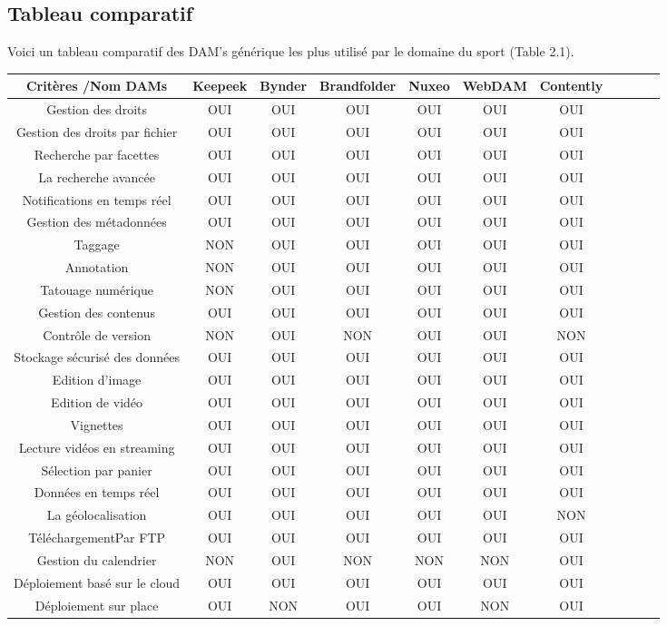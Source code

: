\subsection{Tableau comparatif}
Voici un tableau comparatif des DAM's générique les plus utilisé par le domaine du sport (Table 2.1).
\begin{sidewaystable}[ht]
\begin{center}
\begin{tabular}{|c|c|c|c|c|c|c|c|c|c|c|}
\hline   
Critères /Nom DAMs & Keepeek & Bynder & Brandfolder & Nuxeo &  WebDAM &  Contently \\

\hline
Gestion des droits & OUI & OUI & OUI & OUI & OUI & OUI  \\
\hline	
Gestion des droits par fichier  & OUI & OUI &OUI & OUI & OUI & OUI  \\
\hline
 Recherche par facettes & OUI & OUI & OUI & OUI & OUI & OUI  \\
\hline
 La recherche avancée & OUI & OUI & OUI & OUI & OUI & OUI \\
 \hline
Notifications en temps réel & OUI & OUI & OUI &OUI & OUI & OUI \\
\hline
Gestion des métadonnées&  OUI & OUI & OUI& OUI &OUI & OUI  \\
\hline
 Taggage	 & NON & OUI & OUI & OUI &OUI &OUI  \\
\hline
 Annotation	& NON & OUI & OUI & OUI &OUI & OUI  \\
\hline
Tatouage numérique	  & NON & OUI & OUI & OUI & OUI & OUI \\
\hline
 Gestion des contenus	& OUI & OUI & OUI & OUI & OUI& OUI  \\
\hline
Contrôle de version & NON & OUI &NON & OUI & OUI & NON \\
\hline
Stockage sécurisé des données  & OUI & OUI & OUI & OUI & OUI & OUI\\
\hline
Edition d'image & OUI& OUI & OUI & OUI &OUI & OUI  \\
\hline
 Edition de vidéo  & OUI & OUI & OUI &OUI& OUI &OUI \\
\hline
 Vignettes	& OUI & OUI & OUI & OUI &OUI & OUI  \\
\hline
Lecture vidéos en streaming & OUI & OUI & OUI & OUI & OUI& OUI  \\
\hline
Sélection par panier& OUI & OUI &OUI & OUI & OUI & OUI  \\
\hline
Données en temps réel& OUI  & OUI & OUI &OUI & OUI & OUI  \\
\hline
 La géolocalisation & OUI & OUI & OUI & OUI & OUI & NON \\
\hline
TéléchargementPar FTP	& OUI & OUI & OUI & OUI & OUI & OUI  \\
\hline
Gestion du calendrier& NON & OUI & NON & NON &NON& OUI  \\
\hline
 Déploiement basé sur le cloud & OUI & OUI & OUI & OUI & OUI & OUI  \\
\hline
 Déploiement sur place& OUI & NON & OUI & OUI & NON & OUI  \\


\end{tabular}
\end{center}
\end{sidewaystable}
